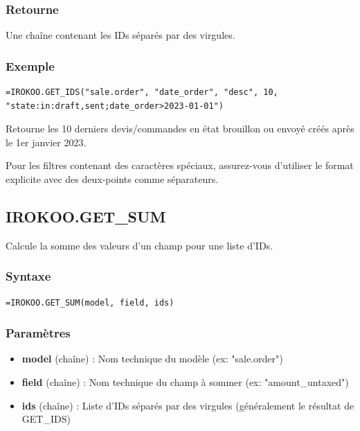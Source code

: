 \documentclass[12pt, a4paper]{article}
\begin{document}
\subsubsection{Retourne}
Une chaîne contenant les IDs séparés par des virgules.

\subsubsection{Exemple}
\begin{lstlisting}
=IROKOO.GET_IDS("sale.order", "date_order", "desc", 10, "state:in:draft,sent;date_order>2023-01-01")
\end{lstlisting}
Retourne les 10 derniers devis/commandes en état brouillon ou envoyé créés après le 1er janvier 2023.

\begin{warning}
Pour les filtres contenant des caractères spéciaux, assurez-vous d'utiliser le format explicite avec des deux-points comme séparateurs.
\end{warning}

\subsection{IROKOO.GET\_SUM}
\begin{tcolorbox}[title=Description]
Calcule la somme des valeurs d'un champ pour une liste d'IDs.
\end{tcolorbox}

\subsubsection{Syntaxe}
\begin{lstlisting}
=IROKOO.GET_SUM(model, field, ids)
\end{lstlisting}

\subsubsection{Paramètres}
\begin{itemize}
    \item \textbf{model} (chaîne) : Nom technique du modèle (ex: "sale.order")
    \item \textbf{field} (chaîne) : Nom technique du champ à sommer (ex: "amount\_untaxed")
    \item \textbf{ids} (chaîne) : Liste d'IDs séparés par des virgules (généralement le résultat de GET\_IDS)
\end{itemize}
\end{document}
